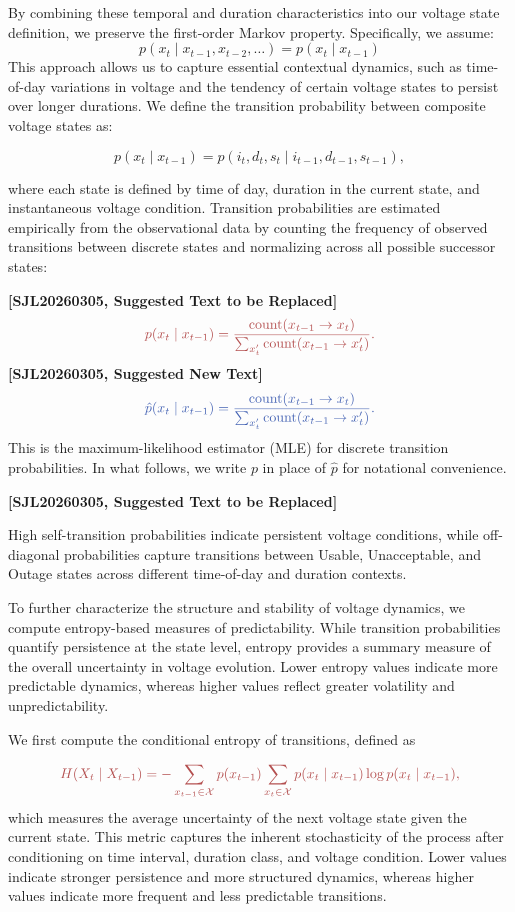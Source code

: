 \documentclass[review]{elsarticle}
\begin{document}
By combining these temporal and duration characteristics into our voltage state definition, we preserve the first-order Markov property. Specifically, we assume:
\[
p(x_t \mid x_{t-1}, x_{t-2}, \dots) = p(x_t \mid x_{t-1})
\]
This approach allows us to capture essential contextual dynamics, such as time-of-day variations in voltage and the tendency of certain voltage states to persist over longer durations.
We define the transition probability between composite voltage states as:  

\[
p(x_t \mid x_{t-1}) = p(i_t, d_t, s_t \mid i_{t-1}, d_{t-1}, s_{t-1}),
\]

where each state is defined by time of day, duration in the current state, and instantaneous voltage condition. Transition probabilities are estimated empirically from the observational data by counting the frequency of observed transitions between discrete states and normalizing across all possible successor states:

{\color{sjlmutedred}\textbf{[SJL20260305, Suggested Text to be Replaced]}}
\[
\color{sjlmutedred}
p(x_t \mid x_{t-1}) =
\frac{\textnormal{count}(x_{t-1} \rightarrow x_t)}
{\sum_{x'_t} \textnormal{count}(x_{t-1} \rightarrow x'_t)}.
\]
{\color{sjlmutedblue}\textbf{[SJL20260305, Suggested New Text]}}
\[
\color{sjlmutedblue}
\hat{p}(x_t \mid x_{t-1}) =
\frac{\textnormal{count}(x_{t-1} \rightarrow x_t)}
{\sum_{x'_t} \textnormal{count}(x_{t-1} \rightarrow x'_t)}.
\]
{\color{sjlmutedblue}This is the maximum-likelihood estimator (MLE) for discrete transition probabilities. In what follows, we write $p$ in place of $\hat{p}$ for notational convenience.}

{\color{sjlmutedred}\textbf{[SJL20260305, Suggested Text to be Replaced]}}

{\color{sjlmutedred}High self-transition probabilities indicate persistent voltage conditions, while off-diagonal probabilities capture transitions between Usable, Unacceptable, and Outage states across different time-of-day and duration contexts.

To further characterize the structure and stability of voltage dynamics, we compute entropy-based measures of predictability. While transition probabilities quantify persistence at the state level, entropy provides a summary measure of the overall uncertainty in voltage evolution. Lower entropy values indicate more predictable dynamics, whereas higher values reflect greater volatility and unpredictability.

We first compute the conditional entropy of transitions, defined as}
\[
\color{sjlmutedred}
H(X_t \mid X_{t-1}) =
- \sum_{x_{t-1} \in \mathcal{X}} p(x_{t-1})
\sum_{x_t \in \mathcal{X}} p(x_t \mid x_{t-1})
\log p(x_t \mid x_{t-1}),
\]
{\color{sjlmutedred}which measures the average uncertainty of the next voltage state given the current state. This metric captures the inherent stochasticity of the process after conditioning on time interval, duration class, and voltage condition. Lower values indicate stronger persistence and more structured dynamics, whereas higher values indicate more frequent and less predictable transitions.}
\end{document}
